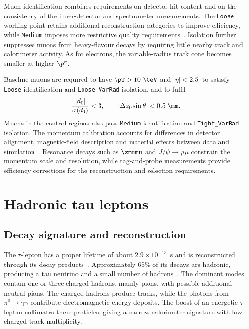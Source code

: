 Muon identification combines requirements on detector hit content and on the consistency of the inner-detector and spectrometer measurements.
The \texttt{Loose} working point retains additional reconstruction categories to improve efficiency, while \texttt{Medium} imposes more restrictive quality requirements~\cite{ATLAS2021MuonID}.
Isolation further suppresses muons from heavy-flavour decays by requiring little nearby track and calorimeter activity.
As for electrons, the variable-radius track cone becomes smaller at higher $\pT$.

Baseline muons are required to have $\pT>10~\GeV$ and $|\eta|<2.5$, to satisfy \texttt{Loose} identification and \texttt{Loose\_VarRad} isolation, and to fulfil
\begin{align}
    \frac{|d_0|}{\sigma(d_0)} < 3,
    \qquad
    |\Delta z_0\sin\theta| < 0.5~\mm.
    \label{eq:ch6_muon_ip}
\end{align}
Muons in the control regions also pass \texttt{Medium} identification and \texttt{Tight\_VarRad} isolation.
The momentum calibration accounts for differences in detector alignment, magnetic-field description and material effects between data and simulation~\cite{ATLAS2023MuonCalibration}.
Resonance decays such as $\zmumu$ and $J/\psi\rightarrow\mu\mu$ constrain the momentum scale and resolution, while tag-and-probe measurements provide efficiency corrections for the reconstruction and selection requirements.

\section{Hadronic tau leptons}
\label{sec:ch6_tau}

\subsection{Decay signature and reconstruction}

The $\tau$-lepton has a proper lifetime of about $2.9\times10^{-13}$~s and is reconstructed through its decay products~\cite{ATLAS2022TauR22}.
Approximately 65\% of its decays are hadronic, producing a tau neutrino and a small number of hadrons~\cite{ATLAS2022TauR22}.
The dominant modes contain one or three charged hadrons, mainly pions, with possible additional neutral pions.
The charged hadrons produce tracks, while the photons from $\pi^0\rightarrow\gamma\gamma$ contribute electromagnetic energy deposits.
The boost of an energetic $\tau$-lepton collimates these particles, giving a narrow calorimeter signature with low charged-track multiplicity.

